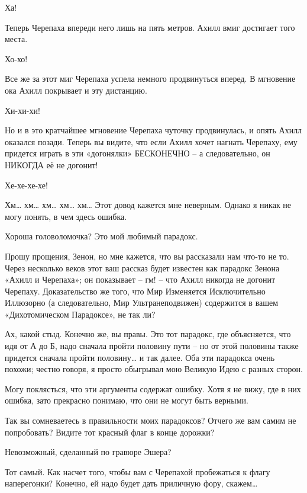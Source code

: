 \documentclass[../main.tex]{subfiles}
\begin{document}
\begin{dialogue}
 Ха!

 Теперь Черепаха впереди него лишь на пять метров. Ахилл вмиг достигает того места.

 Хо-хо!

 Все же за этот миг Черепаха успела немного продвинуться вперед. В мгновение ока Ахилл покрывает и эту дистанцию.

 Хи-хи-хи!

 Но и в это кратчайшее мгновение Черепаха чуточку продвинулась, и опять Ахилл оказался позади. Теперь вы видите, что если Ахилл хочет нагнать Черепаху, ему придется играть в эти «догонялки» БЕСКОНЕЧНО \--- а следовательно, он НИКОГДА её не догонит!

 Хе-хе-хе-хе!

 Хм\ldots{} хм\ldots{} хм\ldots{} хм\ldots{} хм\ldots{} Этот довод кажется мне неверным. Однако я никак не могу понять, в чем здесь ошибка.

 Хороша головоломочка? Это мой любимый парадокс.

 Прошу прощения, Зенон, но мне кажется, что вы рассказали нам что-то не то. Через несколько веков этот ваш рассказ будет известен как парадокс Зенона «Ахилл и Черепаха»; он показывает \--- гм! \--- что Ахилл никогда не догонит Черепаху. Доказательство же того, что Мир Изменяется Исключительно Иллюзорно (а следовательно, Мир Ультранеподвижен) содержится в вашем «Дихотомическом Парадоксе», не так ли?

 Ах, какой стыд. Конечно же, вы правы. Это тот парадокс, где объясняется, что идя от А до Б, надо сначала пройти половину пути \--- но от этой половины также придется сначала пройти половину\ldots{} и так далее. Оба эти парадокса очень похожи; честно говоря, я просто обыгрывал мою Великую Идею с разных сторон.

 Могу поклясться, что эти аргументы содержат ошибку. Хотя я не вижу, где в них ошибка, зато прекрасно понимаю, что они не могут быть верными.

 Так вы сомневаетесь в правильности моих парадоксов? Отчего же вам самим не попробовать? Видите тот красный флаг в конце дорожки?

 Невозможный, сделанный по гравюре Эшера?

 Тот самый. Как насчет того, чтобы вам с Черепахой пробежаться к флагу наперегонки? Конечно, ей надо будет дать приличную фору, скажем\ldots{}


\end{dialogue}
\end{document}
